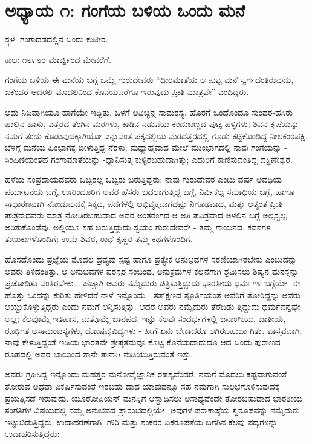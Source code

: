 
\chapter{ಅಧ್ಯಾಯ ೧: ಗಂಗೆಯ ಬಳಿಯ ಒಂದು ಮನೆ}

ಸ್ಥಳ: ಗಂಗಾದಡದಲ್ಲಿನ ಒಂದು ಕುಟೀರ.

ಕಾಲ: ೧೮೯೮ರ ಮಾರ್ಚ್ನಿಂದ ಮೇವರೆಗೆ.

ಗಂಗೆಯ ಬಳಿಯ ಈ ಮನೆಯ ಬಗ್ಗೆ ಒಮ್ಮೆ ಗುರುದೇವರು “ಧೀರಮಾತೆಯ ಆ ಪುಟ್ಟ ಮನೆ ಸ್ವರ್ಗದಂತಿರುವುದು, ಏಕೆಂದರೆ ಅದರಲ್ಲಿ ಮೊದಲಿನಿಂದ ಕೊನೆಯವರೆಗೂ ಇರುವುದು ಪ್ರೀತಿ ಮಾತ್ರವೇ” ಎಂದಿದ್ದರು.

ಅದು ನಿಜವಾಗಿಯೂ ಹಾಗೆಯೇ ಇದ್ದಿತು. ಒಳಗೆ ಅವಿಚ್ಛಿನ್ನ ಸಾಮರಸ್ಯ, ಹೊರಗೆ ಒಂದೊಂದೂ ಸುಂದರ-ಹಸಿರು ಹುಲ್ಲಿನ ಹಾಸು, ಎತ್ತರದ ತೆಂಗಿನ ಮರಗಳು, ಕಾಡಿನ ನಡುವೆಯ ಕಂದುಬಣ್ಣದ ಪುಟ್ಟ ಹಳ್ಳಿಗಳು; ಶಿವನ ಕೃಪೆಯನ್ನು ನಮಗೆ ತಂದು ಕೊಡುವುದಕ್ಕಾಗಿಯೋ ಎನ್ನುವಂತೆ ಪಕ್ಕದಲ್ಲಿಯ ಮರದೆತ್ತರದಲ್ಲಿ ಗೂಡು ಕಟ್ಟಿಕೊಂಡಿದ್ದ ನೀಲಕಂಠಪಕ್ಷಿ. ಬೆಳಗ್ಗೆ ಮನೆಯ ಹಿಂಭಾಗಕ್ಕೆ ಬೀಳುತ್ತಿದ್ದ ನೆರಳು; ಮಧ್ಯಾಹ್ನವಾದ ಮೇಲೆ ಮುಂಭಾಗದಲ್ಲಿ ನಾವು ಗಂಗೆಯನ್ನು - ಸಿಂಹಿಣಿಯಂತಹ ಗಂಗಾಮಾತೆಯನ್ನು -ಧ್ಯಾನಿಸುತ್ತ ಕುಳ್ಳಿರಬಹುದಾಗಿತ್ತು; ಎದುರಿಗೆ ಕಾಣಿಸುವಂತಿದ್ದ ದಕ್ಷಿಣೇಶ್ವರ.

ಹಳೆಯ ಸಂಪ್ರದಾಯದವರು ಒಬ್ಬರಲ್ಲ ಒಬ್ಬರು ಬರುತ್ತಿದ್ದರು; ನಾವು ಗುರುದೇವರ ಎಂಟು ವರ್ಷ ಅವಧಿಯ ಪರ್ಯಟನೆಯ ಬಗ್ಗೆ, ಊರಿಂದೂರಿಗೆ ಅವರ ಹೆಸರು ಬದಲಾಗುತ್ತಿದ್ದ ಬಗ್ಗೆ, ನಿರ್ವಿಕಲ್ಪ ಸಮಾಧಿಯ ಬಗ್ಗೆ, ಹಾಗೂ ಸಾಧಾರಣವಾಗಿ ನೋಡುವುದಕ್ಕೆ ಸಿಕ್ಕದ, ಪದಗಳಲ್ಲಿ ಅಭಿವ್ಯಕ್ತವಾಗದಷ್ಟು ನಿಗೂಢವಾದ, ಮತ್ತು ಅತ್ಯಂತ ಪ್ರೀತಿ ಪಾತ್ರರಾದವರು ಮಾತ್ರ ನೋಡಿರಬಹುದಾದ ಅವರ ಅಂತರಂಗದ ಆ ಅತಿ ಪವಿತ್ರವಾದ ಅಳಲಿನ ಬಗ್ಗೆ ಅಲ್ಪಸ್ವಲ್ಪ ಅರಿತುಕೊಂಡೆವು. ಅಲ್ಲಿಯೂ ಸಹ ಬರುತ್ತಿದ್ದುದು ಸ್ವಯಂ ಗುರುದೇವರೇ - ತಮ್ಮ ಗಾಯನದ, ಕವನಗಳ ತುಣುಕುಗಳೊಂದಿಗೆ; ಉಮೆ ಶಿವರ, ರಾಧೆ ಕೃಷ್ಣರ ತಮ್ಮ ಕಥೆಗಳೊಂದಿಗೆ.

ಹೊಸದೊಂದು ಪ್ರಜ್ಞೆಯ ಮೊದಲ ದ್ರವ್ಯವು ಸ್ಪಷ್ಟ ಹಾಗೂ ಪ್ರತ್ಯೇಕ ಅನುಭವಗಳ ಸರಣಿಯಾಗಿರಬೇಕು ಎಂಬುದನ್ನು ಅವರು ತಿಳಿದಂತಿತ್ತು. ಆ ಅನುಭವಗಳ ಪರಸ್ಪರ ಸಂಬಂಧ, ಅನುಕ್ರಮಗಳ ಕಲ್ಪನೆಗಾಗಿ ಶ್ರಮಿಸಲು ಶಿಷ್ಯನ ಮನಸ್ಸನ್ನು ಪ್ರಚೋದಿಸು ವಂತಿರಬೇಕು... ಹೆಚ್ಚಾಗಿ ಅವರು ನಮ್ಮೆದುರು ಚಿತ್ರಿಸುತ್ತಿದ್ದುದು ಭಾರತೀಯ ಧರ್ಮಗಳ ಬಗ್ಗೆಯೇ -ಈ ಹೊತ್ತು ಒಂದನ್ನು ಕುರಿತು ಹೇಳಿದರೆ ನಾಳೆ ಇನ್ನೊಂದು - ತತ್ಕ್ಷಣದ ಸ್ಪೂರ್ತಿಯಂತೆ ಅವರಿಗೆ ತೋರಿದ್ದನ್ನು ಅವರು ಆಯ್ದುಕೊಳ್ಳುತ್ತಿದ್ದರು ಎಂದು ನಮಗೆ ಅನ್ನಿಸುತ್ತಿತ್ತು. ಆದರೆ ಅವರು ನಮ್ಮೆದುರು ತೆರೆದಿಡು ತ್ತಿದ್ದುದು ಧರ್ಮವನ್ನಷ್ಟೇ ಅಲ್ಲ; ಕೆಲವೊಮ್ಮೆ ಇತಿಹಾಸ, ಮತ್ತೊಮ್ಮೆ ಜಾನಪದ, ಇನ್ನು ಕೆಲವು ಸಂದರ್ಭಗಳಲ್ಲಿ ಜನಾಂಗೀಯ, ಜಾತೀಯ, ರೂಢಿಗತ ಅಸಾಮಂಜಸ್ಯಗಳು, ದೋಷವೈವಿಧ್ಯಗಳು - ಹೀಗೆ ಏನು ಬೇಕಾದರೂ ಆಗಿರಬಹುದಾ ಗಿತ್ತು. ವಾಸ್ತವವಾಗಿ, ನಾವು ಕೇಳುತ್ತಿದ್ದಂತೆ ಇಡಿಯ ಭಾರತವೇ ಶ್ರೇಷ್ಠತಮವೂ ಕೊಟ್ಟ ಕೊನೆಯದಾದುದೂ ಆದ ಒಂದು ಪುರಾಣದ ರೂಪದಲ್ಲಿ ಅವರ ಬಾಯಿಂದ ತಾನೇ ತಾನಾಗಿ ನುಡಿಯುತ್ತಿರುವಂತೆ ಇತ್ತು.

ಅವರು ಗ್ರಹಿಸಿದ್ದ ಇನ್ನೊಂದು ಮಹತ್ತರ ಮನೋವೈಜ್ಞಾನಿಕ ರಹಸ್ಯವೆಂದರೆ, ನಮಗೆ ಮೊದಲು ಕಷ್ಟವಾಗುವಂತೆ ತೋರುವ ಅಥವಾ ವಿಕರ್ಷಿಸುವಂತೆ ಇರಬಹು ದಾದ ಯಾವುದನ್ನೂ ಸಹ ನಮಗಾಗಿ ಸುಲಭಗೊಳಿಸುವುದಕ್ಕೆ ಪ್ರಯತ್ನಿಸದೆ ಇರುವುದು. ಯೂರೋಪಿಯನ್ ಮನಸ್ಸಿಗೆ ಆಸ್ವಾದಿಸಲು ಅಸಾಧ್ಯವೆಂದೇ ತೋರಬಹುದಾದ ಭಾರತೀಯ ಸಂಗತಿಗಳ ವಿಷಯದಲ್ಲಿ ನಮ್ಮ ಅನುಭವದ ಪ್ರಾರಂಭದಲ್ಲಿಯೇ- ಅವುಗಳ ಪರಾಕಾಷ್ಠೆಯ ಸ್ವರೂಪವನ್ನು ನಮ್ಮೆದುರು ಇಟ್ಟುಬಿಡುತ್ತಿದ್ದರು. ಉದಾಹರಣೆಗಾಗಿ, ಗೌರಿ ಮತ್ತು ಶಂಕರರ ಏಕರೂಪತೆಯ ಬಗೆಗಿನ ಕೆಲವು ಪದ್ಯಗಳನ್ನು ಉದಾಹರಿಸುತ್ತಿದ್ದರು:

